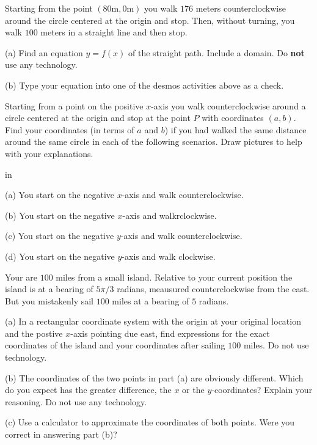 \documentclass{ximera}
\newcommand{\pskip}{\vskip 0.1 in}
\begin{document}
\begin{question}  \label{sdfdsaf4t5r:Cosine}
Starting from the point $(80 \text{m},0 \text{m})$ you walk $176$ meters counterclockwise around the circle centered at the origin and stop. Then, without turning, you walk $100$ meters in a straight line and then stop.

(a) Find an equation $y=f(x)$ of the straight path. Include a domain. Do {\bf not} use any technology.

(b) Type your equation into one of the desmos activities above as a check.

\end{question}


\begin{question}  \label{tagtec4t5r:Cosine}
Starting from a point on the positive $x$-axis you walk counterclockwise around a circle centered at the origin and stop at the point $P$ with coordinates $(a,b)$. Find your coordinates (in terms of $a$ and $b$) if you had walked the same distance around the same circle in each of the following scenarios. Draw pictures to help with your explanations.

\pskip

(a) You start on the negative $x$-axis and walk counterclockwise.

(b) You start on the negative $x$-axis and walkrclockwise.

(c) You start on the negative $y$-axis and walk counterclockwise.

(d) You start on the negative $y$-axis and walk clockwise.

\end{question}


\begin{question}  \label{tdsfdsfkt5r:Cosine}
Your are $100$ miles from a small island. Relative to your current position the island is at a bearing of $5\pi/3$ radians, meausured counterclockwise from the east. But you mistakenly sail $100$ miles at a bearing of $5$ radians.

(a) In a rectangular coordinate system with the origin at your original location and the postive $x$-axis pointing due east, find expressions for the exact coordinates of the island and your coordinates after sailing $100$ miles. Do not use technology.

(b) The coordinates of the two points in part (a) are obviously different. Which do you expect has the greater difference, the $x$ or the $y$-coordinates? Explain your reasoning. Do not use any technology.

(c) Use a calculator to approximate the coordinates of both points. Were you correct in answering part (b)?


\end{question}
\end{document}
